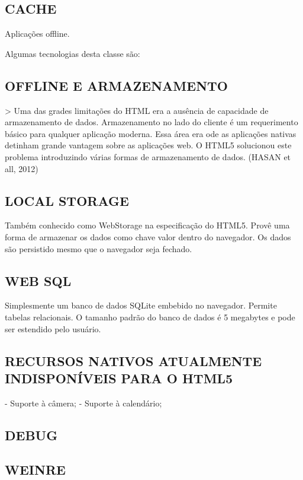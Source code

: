 \documentclass[11pt,a4paper]{article}
\begin{document}
\subsection{ CACHE}

Aplicações offline.

Algumas tecnologias desta classe são:

\subsection{ OFFLINE E ARMAZENAMENTO}

> Uma das grades limitações do HTML era a ausência de capacidade de armazenamento de dados. Armazenamento no lado do cliente é um requerimento básico para qualquer aplicação moderna. Essa área era ode as aplicações nativas detinham grande vantagem sobre as aplicações web. O HTML5 solucionou este problema introduzindo várias formas de armazenamento de dados. (HASAN et all, 2012)

\subsection{ LOCAL STORAGE}

Também conhecido como WebStorage na especificação do HTML5. Provê uma forma de armazenar os dados como chave valor dentro do navegador. Os dados são persistido mesmo que o navegador seja fechado.

\subsection{WEB SQL}

Simplesmente um banco de dados SQLite embebido no navegador. Permite tabelas relacionais. O tamanho padrão do banco de dados é 5 megabytes e pode ser estendido pelo usuário.

\subsection{ RECURSOS NATIVOS ATUALMENTE INDISPONÍVEIS PARA O HTML5}

- Suporte à câmera;
- Suporte à calendário;

\subsection{ DEBUG}

\subsection{ WEINRE}
\end{document}
